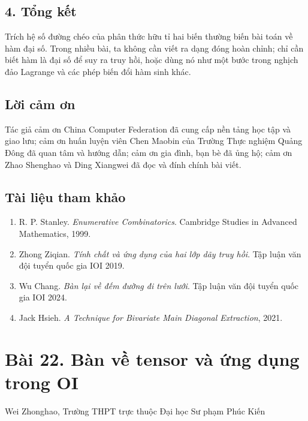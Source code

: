 \documentclass[11pt]{article}
\begin{document}
\subsection*{4. Tổng kết}

Trích hệ số đường chéo của phân thức hữu tỉ hai biến thường biến bài toán về
hàm đại số. Trong nhiều bài, ta không cần viết ra dạng đóng hoàn chỉnh; chỉ
cần biết hàm là đại số để suy ra truy hồi, hoặc dùng nó như một bước trong
nghịch đảo Lagrange và các phép biến đổi hàm sinh khác.

\subsection*{Lời cảm ơn}

Tác giả cảm ơn China Computer Federation đã cung cấp nền tảng học tập và giao
lưu; cảm ơn huấn luyện viên Chen Maobin của Trường Thực nghiệm Quảng Đông đã
quan tâm và hướng dẫn; cảm ơn gia đình, bạn bè đã ủng hộ; cảm ơn Zhao Shenghao
và Ding Xiangwei đã đọc và đính chính bài viết.

\subsection*{Tài liệu tham khảo}

\begin{enumerate}
  \item R. P. Stanley. \emph{Enumerative Combinatorics}. Cambridge Studies in
  Advanced Mathematics, 1999.
  \item Zhong Ziqian. \emph{Tính chất và ứng dụng của hai lớp dãy truy hồi}.
  Tập luận văn đội tuyển quốc gia IOI 2019.
  \item Wu Chang. \emph{Bàn lại về đếm đường đi trên lưới}. Tập luận văn đội
  tuyển quốc gia IOI 2024.
  \item Jack Hsieh. \emph{A Technique for Bivariate Main Diagonal Extraction},
  2021.
\end{enumerate}

\section*{Bài 22. Bàn về tensor và ứng dụng trong OI}

\begin{center}
Wei Zhonghao, Trường THPT trực thuộc Đại học Sư phạm Phúc Kiến
\end{center}
\end{document}
